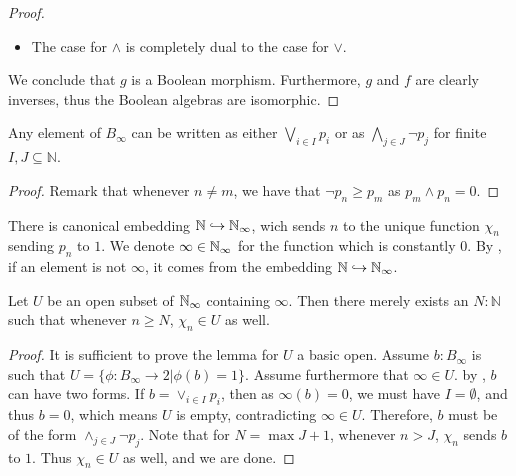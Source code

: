 \begin{proof}
\begin{itemize}
\begin{itemize}
%
%
      \end{itemize}
    \item The case for $\wedge$ is completely dual to the case for $\vee$. 
  \end{itemize}
We conclude that $g$ is a Boolean morphism. 
Furthermore, $g$ and $f$ are clearly inverses, thus the Boolean algebras are isomorphic. 
\end{proof}

  \begin{lemma}\label{lemBinftyNormalForm}
  Any element of $B_\infty$ can be written as 
  either $\bigvee_{i\in I} p_i$  or
  as $\bigwedge_{j\in J} \neg p_j$ 
  for finite $I,J\subseteq \mathbb N$. 
\end{lemma}
\begin{proof}
  Remark that whenever $n \neq m$, we have that 
  $\neg p_n \geq p_m$ as $p_m \wedge p_n = 0$. 
\end{proof}
There is canonical embedding $\mathbb N \hookrightarrow \mathbb{N}_{\infty}$, 
wich sends $n$ to the unique function $\chi_{n}$ sending $p_n$ to $1$. 
We denote $\infty \in \mathbb{N}_{\infty}$ for the function which is constantly $0$. 
By , if an element is not $\infty$, 
it comes from the embedding $\mathbb N \hookrightarrow \mathbb{N}_{\infty}$. 
\begin{lemma}\label{LemmaOpensContainingInfty}
  Let $U$ be an open subset of $\mathbb{N}_{\infty}$ containing $\infty$.
  Then there merely exists an $N:\mathbb N$ such that whenever $n\geq N$, 
  $\chi_n\in U$ as well. 
\end{lemma}
\begin{proof}
  It is sufficient to prove the lemma for $U$ a basic open. 
  Assume $b : B_\infty $ is such that 
  $U = \{ \phi: B_\infty \to 2| \phi(b) = 1\}$.
  Assume furthermore that $\infty \in U$.
  by , $b$ can have two forms.
  If $b = \vee_{i\in I} p_i$, then as $\infty(b) = 0$, 
  we must have $I = \emptyset$, and thus $b = 0$, 
  which means $U$ is empty, contradicting $\infty\in U$. 
  Therefore, 
  $b$ must be of the form $\wedge_{j \in J} \neg p_j$. 
  Note that for $N = \max J + 1$, whenever $n>J$, 
  $\chi_n$  sends $b$ to $1$. 
  Thus $\chi_n \in U$ as well, and we are done. 
\end{proof}

